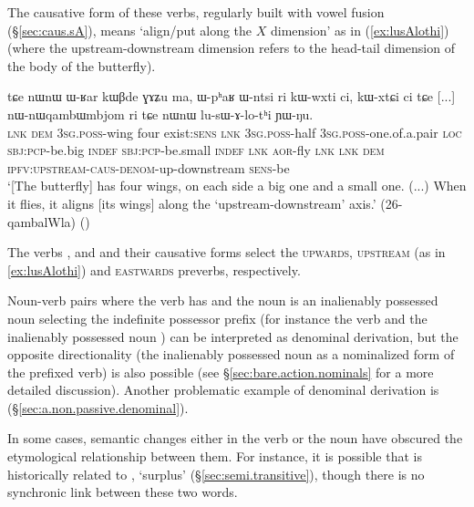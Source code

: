 The causative form of these verbs, regularly built with vowel fusion   (§\ref{sec:caus.sA}), means `align/put along the $X$ dimension' as in (\ref{ex:lusAlothi}) (where the upstream-downstream dimension refers to the head-tail dimension of the body of the butterfly).

\begin{exe}
\ex \label{ex:lusAlothi}
\gll tɕe nɯnɯ ɯ-ʁar kɯβde ɣɤʑu ma, ɯ-pʰaʁ ɯ-ntsi ri kɯ-wxti ci, kɯ-xtɕi ci tɕe [...] nɯ-nɯqambɯmbjom ri tɕe nɯnɯ lu-sɯ-ɤ-lo-tʰi ɲɯ-ŋu. \\
\textsc{lnk} \textsc{dem} \textsc{3sg}.\textsc{poss}-wing four exist:\textsc{sens} \textsc{lnk} \textsc{3sg}.\textsc{poss}-half \textsc{3sg}.\textsc{poss}-one.of.a.pair \textsc{loc} \textsc{sbj}:\textsc{pcp}-be.big \textsc{indef} \textsc{sbj}:\textsc{pcp}-be.small \textsc{indef} \textsc{lnk} { }  \textsc{aor}-fly \textsc{lnk} \textsc{lnk} \textsc{dem} \textsc{ipfv}:\textsc{upstream}-\textsc{caus}-\textsc{denom}-up-downstream \textsc{sens}-be \\
\glt `[The butterfly] has four wings, on each side a big one and a small one. (...) When it flies, it aligns [its wings] along the `upstream-downstream' axis.' (26-qambalWla)
()
\end{exe}

The verbs ,  and  and their causative forms  select the \textsc{upwards}, \textsc{upstream} (as in \ref{ex:lusAlothi}) and \textsc{eastwards} preverbs, respectively.


Noun-verb pairs where the verb has  and the noun is an inalienably possessed noun selecting the  indefinite possessor prefix (for instance the verb  and the inalienably possessed noun  ) can be interpreted as  denominal derivation, but the opposite directionality (the inalienably possessed noun as a nominalized form of the  prefixed verb) is also possible (see §\ref{sec:bare.action.nominals} for a more detailed discussion). Another problematic example of  denominal derivation is  (§\ref{sec:a.non.passive.denominal}).

In some cases, semantic changes either in the verb or the noun have obscured the etymological relationship between them. For instance, it is possible that  is historically related to , `surplus' (§\ref{sec:semi.transitive}), though there is no synchronic link between these two words.
 
